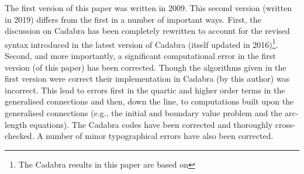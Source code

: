 \documentclass[a4paper,12pt]{article}
\numberwithin{equation}{section}
\begin{document}


\lstset{numbers=left,gobble=2,basicstyle=\ttfamily\small,escapechar=|}

\title{\Title}
\author{\Author\\[10pt]%
School of Mathematical Sciences\\%
Monash University, 3800\\%
Australia}
\date{12-Aug-2009 (v1)\\
      10-Dec-2019 (v2)}%

\maketitle

\begin{abstract}
\noindent
%
Riemann normal coordinate expansions of the metric and other geometrical quantities,
including the geodesic arc-length, will be presented. All of the results are given to
fifth-order in the curvature and were obtained using the computer algebra package Cadabra.

\end{abstract}

The first version of this paper was written in 2009. This second version (written in 2019)
differs from the first in a number of important ways. First, the discussion on Cadabra has
been completely rewritten to account for the revised syntax introduced in the latest version
of Cadabra (itself updated in 2016)\footnote{The Cadabra results in this paper are based on
\CdbVersion}. Second, and more importantly, a significant computational error in the first
version (of this paper) has been corrected. Though the algorithms given in the first version
were correct their implementation in Cadabra (by this author) was incorrect. This lead to
errors first in the quartic and higher order terms in the generalised connections and then,
down the line, to computations built upon the generalised connections (e.g., the initial and
boundary value problem and the arc-length equations). The Cadabra codes have been corrected
and thoroughly cross-checked. A number of minor typographical errors have also been
corrected.
\EndNote
\end{document}
